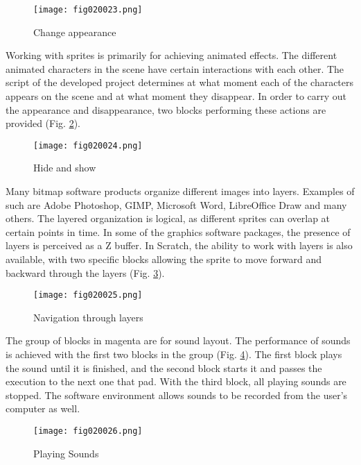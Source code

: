 \begin{figure}[H]
   \centering
   \texttt{[image: fig020023.png]}
   \caption{Change appearance}
\label{fig020023}
\end{figure}

Working with sprites is primarily for achieving animated effects. The different animated characters in the scene have certain interactions with each other. The script of the developed project determines at what moment each of the characters appears on the scene and at what moment they disappear. In order to carry out the appearance and disappearance, two blocks performing these actions are provided (Fig. \ref{fig020024}).

\begin{figure}[H]
   \centering
   \texttt{[image: fig020024.png]}
   \caption{Hide and show}
\label{fig020024}
\end{figure}

Many bitmap software products organize different images into layers. Examples of such are Adobe Photoshop, GIMP, Microsoft Word, LibreOffice Draw and many others. The layered organization is logical, as different sprites can overlap at certain points in time. In some of the graphics software packages, the presence of layers is perceived as a Z buffer. In Scratch, the ability to work with layers is also available, with two specific blocks allowing the sprite to move forward and backward through the layers (Fig. \ref{fig020025}).

\begin{figure}[H]
   \centering
   \texttt{[image: fig020025.png]}
   \caption{Navigation through layers}
\label{fig020025}
\end{figure}

The group of blocks in magenta are for sound layout. The performance of sounds is achieved with the first two blocks in the group (Fig. \ref{fig020026}). The first block plays the sound until it is finished, and the second block starts it and passes the execution to the next one that pad. With the third block, all playing sounds are stopped. The software environment allows sounds to be recorded from the user's computer as well.

\begin{figure}[H]
   \centering
   \texttt{[image: fig020026.png]}
   \caption{Playing Sounds}
\label{fig020026}
\end{figure}

